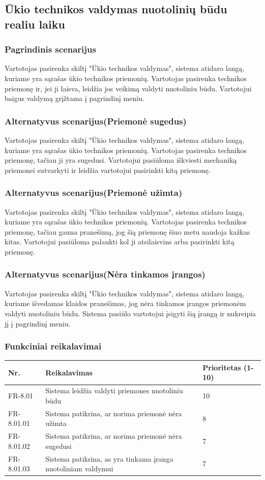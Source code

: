 \documentclass[oneside]{VUMIFPSkursinis}
\begin{document}
\subsection{Ūkio technikos valdymas nuotolinių būdu realiu laiku}
\subsubsection{Pagrindinis scenarijus}
	Vartotojas pasirenka skiltį "Ūkio technikos valdymas", sistema atidaro langą, kuriame yra sąrašas ūkio technikos priemonių. Vartotojas pasirenka technikos priemonę ir, jei ji laisva, leidžia jos veikimą valdyti nuotoliniu būdu. Vartotojui baigus valdymą grįžtama į pagrindinį meniu.
\subsubsection{Alternatyvus scenarijus(Priemonė sugedus)}
	Vartotojas pasirenka skiltį "Ūkio technikos valdymas", sistema atidaro langą, kuriame yra sąrašas ūkio technikos priemonių. Vartotojas pasirenka technikos priemonę, tačiau ji yra sugedusi. Vartotojui pasiūloma iškviesti mechaniką priemonei sutvarkyti ir leidžia vartotojui pasirinkti kitą priemonę.
\subsubsection{Alternatyvus scenarijus(Priemonė užimta)}
	Vartotojas pasirenka skiltį "Ūkio technikos valdymas", sistema atidaro langą, kuriame yra sąrašas ūkio technikos priemonių. Vartotojas pasirenka technikos priemonę, tačiau gauna pranešimą, jog šią priemonę šiuo metu naudoja kažkas kitas. Vartotojui pasiūloma palaukti kol ji atsilaisvins arba pasirinkti kitą priemonę.
\subsubsection{Alternatyvus scenarijus(Nėra tinkamos įrangos)}
	Vartotojas pasirenka skiltį "Ūkio technikos valdymas", sistema atidaro langą, kuriame išvedamas klaidos pranešimas, jog nėra tinkamos įrangos priemonėm valdyti nuotoliniu būdu. Sistema pasiūlo vartotojui įsigyti šią įrangą ir nukreipia jį į pagrindinį meniu.
\subsubsection{Funkciniai reikalavimai}
\begin{table}[htbp]
	\begin{tabularx}{1\textwidth}{ |P{2.5cm}|X|P{3cm }| }  \hline
           	Nr. & Reikalavimas &  Prioritetas (1-10)  \\   \hline 
         		FR-8.01 & Sistema leidžia valdyti priemones nuotoliniu būdu & 10  \\   \hline
		FR-8.01.01 & Sistema patikrina, ar norima priemonė nėra užimta & 8  \\ \hline
		FR-8.01.02 & Sistema patikrina, ar norima priemonė nėra sugedusi & 7 \\ \hline
		FR-8.01.03 & Sistema patikrina, as yra tinkama įranga nuotoliniam valdymui & 7 \\  \hline
	\end{tabularx}
\end{table}
\end{document}

